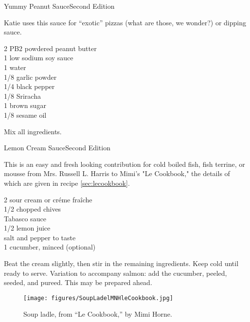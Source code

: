 \begin{entry}{Yummy Peanut Sauce}{Second Edition}

\begin{open}
 Katie uses this sauce for ``exotic'' pizzas (what are those, we wonder?) or dipping sauce.
\end{open}
\begin{ingredients}
  \SI{2}{\tblspoon} PB2 powdered peanut butter \\
  \SI{1}{\teaspoon} low sodium soy sauce \\
  \SI{1}{\tblspoon} water \\
  \SI{1/8}{\teaspoon} garlic powder \\
 \SI{1/4}{\teaspoon} black pepper \\
  \SI{1/8}{\teaspoon} Sriracha \\
 \SI{1}{\tblspoon} brown sugar \\
   \SI{1/8}{\teaspoon} sesame oil
\end{ingredients}

Mix all ingredients.

\end{entry}

\begin{entry}{Lemon Cream Sauce}{Second Edition}

\begin{open}
 This is an easy and fresh looking contribution for cold boiled fish, fish terrine, or mousse from Mrs. Russell L. Harris to Mimi's "Le Cookbook," the details of which are given in recipe \ref{sec:lecookbook}.
\end{open}
\begin{ingredients}
   \SI{2}{\cup} sour cream or cr\'eme fra\^iche \\
  \SI{1/2}{\cup} chopped chives \\
  Tabasco sauce \\
  \SI{1/2}{\cup} lemon juice \\
  salt and pepper to taste \\
 \SI{1}{\cup} cucumber, minced (optional)

\end{ingredients}

Beat the cream slightly, then stir in the remaining ingredients. Keep cold until ready to serve. Variation to accompany salmon: add the cucumber, peeled, seeded, and pureed. This may be prepared ahead.

\begin{figure}[h]
    \centering
    \texttt{[image: figures/SoupLadelMNHleCookbook.jpg]}
    \caption{Soup ladle, from ``Le Cookbook,'' by Mimi Horne.}
    \label{fig:mimi_ladel}
\end{figure}
\end{entry}


